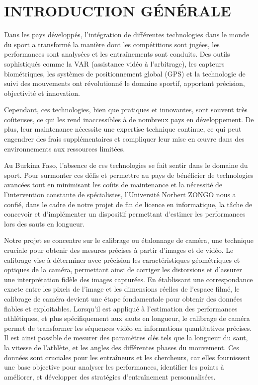 \chapter*{INTRODUCTION GÉNÉRALE}
\adjustmtc
\thispagestyle{MyStyle}


  Dans les pays développés, l'intégration de différentes technologies dans le monde du sport a transformé la manière dont les compétitions sont jugées, les performances sont analysées et les entraînements sont conduits. Des outils sophistiqués comme la VAR (assistance vidéo à l'arbitrage), les capteurs biométriques, les systèmes de positionnement global (GPS) et la technologie de suivi des mouvements ont révolutionné le domaine sportif, apportant précision, objectivité et innovation.
  
  Cependant, ces technologies, bien que pratiques et innovantes, sont souvent très coûteuses, ce qui les rend inaccessibles à de nombreux pays en développement. De plus, leur maintenance nécessite une expertise technique continue, ce qui peut engendrer des frais supplémentaires et compliquer leur mise en œuvre dans des environnements aux ressources limitées.
  
  Au Burkina Faso, l'absence de ces technologies se fait sentir dans le domaine du sport. Pour surmonter ces défis et permettre au pays de bénéficier de technologies avancées tout en minimisant les coûts de maintenance et la nécessité de l'intervention constante de spécialistes, l'Université Norbert ZONGO nous a confié, dans le cadre de notre projet de fin de licence en informatique, la tâche de concevoir et d'implémenter un dispositif permettant d’estimer les performances lors des sauts en longueur.
  
  Notre projet se concentre sur le calibrage ou étalonnage de caméra, une technique cruciale pour obtenir des mesures précises à partir d'images et de vidéo. Le calibrage vise à déterminer avec précision les caractéristiques géométriques et optiques de la caméra, permettant ainsi de corriger les distorsions et d'assurer une interprétation fidèle des images capturées. En établissant une correspondance exacte entre les pixels de l'image et les dimensions réelles de l'espace filmé, le calibrage de caméra devient une étape fondamentale pour obtenir des données fiables et exploitables. Lorsqu'il est appliqué à l'estimation des performances athlétiques, et plus spécifiquement aux sauts en longueur, le calibrage de caméra permet de transformer les séquences vidéo en informations quantitatives précises. Il est ainsi possible de mesurer des paramètres clés tels que la longueur du saut, la vitesse de l'athlète, et les angles des différentes phases du mouvement. Ces données sont cruciales pour les entraîneurs et les chercheurs, car elles fournissent une base objective pour analyser les performances, identifier les points à améliorer, et développer des stratégies d'entraînement personnalisées.
  
